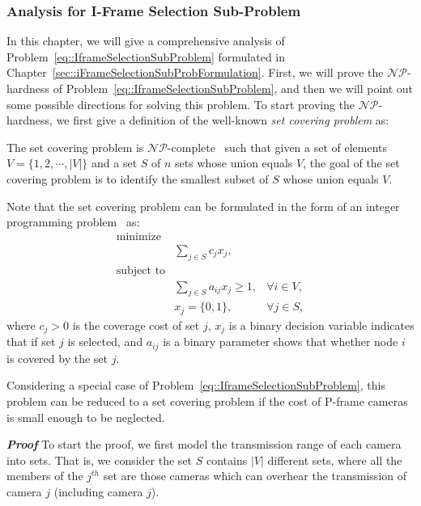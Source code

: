 \subsubsection{Analysis for I-Frame Selection Sub-Problem}
In this chapter, we will give a comprehensive analysis of Problem~\eqref{eq::IframeSelectionSubProblem} formulated in Chapter~\ref{sec::iFrameSelectionSubProbFormulation}.
First, we will prove the $\mathcal{NP}$-hardness of Problem~\eqref{eq::IframeSelectionSubProblem}, and then we will point out some possible directions for solving this problem.
To start proving the $\mathcal{NP}$-hardness, we first give a definition of the well-known \emph{set covering problem} as:
\begin{mydef}
The set covering problem is $\mathcal{NP}$-complete~\cite{SetCoveringNPComplete} such that given a set of elements $V = \{1,2,\cdots,|V|\}$ and a set $S$ of $n$ sets whose union equals $V$, the goal of the set covering problem is to identify the smallest subset of $S$ whose union equals $V$.
\label{def::SCP}
\end{mydef}
Note that the set covering problem can be formulated in the form of an integer programming problem~\cite{SetCoveringFormulation} as:
\begin{align}
\text{minimize} & & \nonumber \\
 &\sum_{j \in S} c_j x_j, & \nonumber \\
\text{subject to} & & \nonumber \\
 &\sum_{j \in S} a_{ij}x_j \geq 1, &\forall i \in V, \nonumber \\
 &x_{j} = \{0,1\}, &\forall j \in S,
\label{eq::SetCoveringProblemFormualtion}
\end{align}
where $c_j > 0$ is the coverage cost of set $j$, $x_j$ is a binary decision variable indicates that if set $j$ is selected, and $a_{ij}$ is a binary parameter shows that whether node $i$ is covered by the set $j$.
\begin{mylem}
Considering a special case of Problem~\eqref{eq::IframeSelectionSubProblem}, this problem can be reduced to a set covering problem if the cost of P-frame cameras is small enough to be neglected.
\label{lemma::ReduceProb}
\end{mylem}
\textbf{\emph{Proof}}
To start the proof, we first model the transmission range of each camera into sets.
That is, we consider the set $S$ contains $|V|$ different sets, where all the members of the $j^{th}$ set are those cameras which can overhear the transmission of camera $j$ (including camera $j$).
